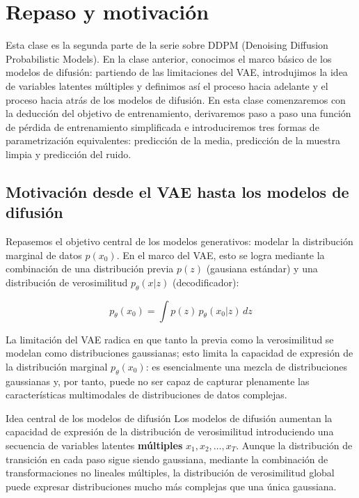 \section{Repaso y motivación}

Esta clase es la segunda parte de la serie sobre DDPM (Denoising Diffusion Probabilistic Models). En la clase anterior, conocimos el marco básico de los modelos de difusión: partiendo de las limitaciones del VAE, introdujimos la idea de variables latentes múltiples y definimos así el proceso hacia adelante y el proceso hacia atrás de los modelos de difusión. En esta clase comenzaremos con la deducción del objetivo de entrenamiento, derivaremos paso a paso una función de pérdida de entrenamiento simplificada e introduciremos tres formas de parametrización equivalentes: predicción de la media, predicción de la muestra limpia y predicción del ruido.

\subsection{Motivación desde el VAE hasta los modelos de difusión}

Repasemos el objetivo central de los modelos generativos: modelar la distribución marginal de datos $p(x_0)$. En el marco del VAE, esto se logra mediante la combinación de una distribución previa $p(z)$ (gausiana estándar) y una distribución de verosimilitud $p_\theta(x|z)$ (decodificador):

$$p_\theta(x_0) = \int p(z) \, p_\theta(x_0 | z) \, dz$$

La limitación del VAE radica en que tanto la previa como la verosimilitud se modelan como distribuciones gaussianas; esto limita la capacidad de expresión de la distribución marginal $p_\theta(x_0)$: es esencialmente una mezcla de distribuciones gaussianas y, por tanto, puede no ser capaz de capturar plenamente las características multimodales de distribuciones de datos complejas.

\begin{importantbox}{Idea central de los modelos de difusión}
Los modelos de difusión aumentan la capacidad de expresión de la distribución de verosimilitud introduciendo una secuencia de variables latentes \textbf{múltiples} $x_1, x_2, \dots, x_T$. Aunque la distribución de transición en cada paso sigue siendo gaussiana, mediante la combinación de transformaciones no lineales múltiples, la distribución de verosimilitud global puede expresar distribuciones mucho más complejas que una única gaussiana.
\end{importantbox}

